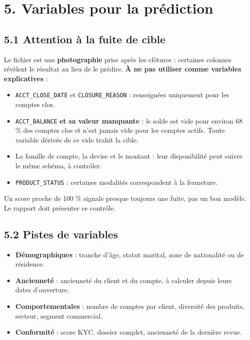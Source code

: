 \documentclass[11pt,a4paper]{article}
\providecommand{\tightlist}{\setlength{\itemsep}{0pt}\setlength{\parskip}{0pt}}
\begin{document}
\section{5. Variables pour la
prédiction}\label{variables-pour-la-pruxe9diction}

\subsection{5.1 Attention à la fuite de
cible}\label{attention-uxe0-la-fuite-de-cible}

Le fichier est une \textbf{photographie} prise après les clôtures :
certaines colonnes révèlent le résultat au lieu de le prédire. \textbf{À
ne pas utiliser comme variables explicatives} :

\begin{itemize}
\tightlist
\item
  \texttt{ACCT\_CLOSE\_DATE} et \texttt{CLOSURE\_REASON} : renseignées
  uniquement pour les comptes clos.
\item
  \texttt{ACCT\_BALANCE} \textbf{et sa valeur manquante} : le solde est
  vide pour environ 68 \% des comptes clos et n'est jamais vide pour les
  comptes actifs. Toute variable dérivée de ce vide trahit la cible.
\item
  La famille de compte, la devise et le montant : leur disponibilité
  peut suivre le même schéma, à contrôler.
\item
  \texttt{PRODUCT\_STATUS} : certaines modalités correspondent à la
  fermeture.
\end{itemize}

Un score proche de 100 \% signale presque toujours une fuite, pas un bon
modèle. Le rapport doit présenter ce contrôle.

\subsection{5.2 Pistes de variables}\label{pistes-de-variables}

\begin{itemize}
\tightlist
\item
  \textbf{Démographiques} : tranche d'âge, statut marital, zone de
  nationalité ou de résidence.
\item
  \textbf{Ancienneté} : ancienneté du client et du compte, à calculer
  depuis leurs dates d'ouverture.
\item
  \textbf{Comportementales} : nombre de comptes par client, diversité
  des produits, secteur, segment commercial.
\item
  \textbf{Conformité} : score KYC, dossier complet, ancienneté de la
  dernière revue.
\end{itemize}
\end{document}
